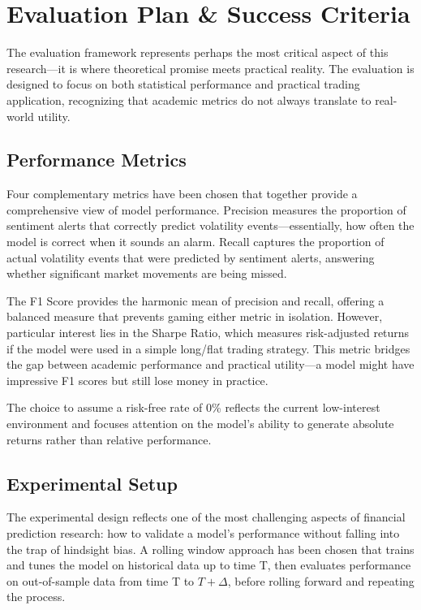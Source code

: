\documentclass[11pt,twocolumn]{article}
\begin{document}
\section{Evaluation Plan \& Success Criteria}
The evaluation framework represents perhaps the most critical aspect of this research—it is where theoretical promise meets practical reality. The evaluation is designed to focus on both statistical performance and practical trading application, recognizing that academic metrics do not always translate to real-world utility.

\subsection{\textbf{Performance Metrics}}
Four complementary metrics have been chosen that together provide a comprehensive view of model performance. Precision measures the proportion of sentiment alerts that correctly predict volatility events—essentially, how often the model is correct when it sounds an alarm. Recall captures the proportion of actual volatility events that were predicted by sentiment alerts, answering whether significant market movements are being missed.

The F1 Score provides the harmonic mean of precision and recall, offering a balanced measure that prevents gaming either metric in isolation. However, particular interest lies in the Sharpe Ratio, which measures risk-adjusted returns if the model were used in a simple long/flat trading strategy. This metric bridges the gap between academic performance and practical utility—a model might have impressive F1 scores but still lose money in practice.

The choice to assume a risk-free rate of 0\% reflects the current low-interest environment and focuses attention on the model's ability to generate absolute returns rather than relative performance.

\subsection{\textbf{Experimental Setup}}
The experimental design reflects one of the most challenging aspects of financial prediction research: how to validate a model's performance without falling into the trap of hindsight bias. A rolling window approach has been chosen that trains and tunes the model on historical data up to time T, then evaluates performance on out-of-sample data from time T to $T+\Delta$, before rolling forward and repeating the process.
\end{document}

